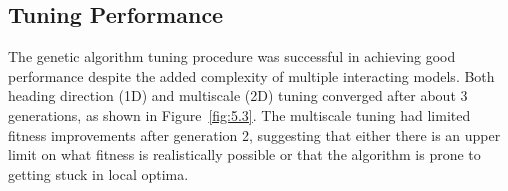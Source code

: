 \subsection{Tuning Performance}
\label{subsec:GA}

The genetic algorithm tuning procedure was successful in achieving good performance despite the added complexity of multiple interacting models. Both heading direction (1D) and multiscale (2D) tuning converged after about 3 generations, as shown in Figure~\ref{fig:5.3}. The multiscale tuning had limited fitness improvements after generation 2, suggesting that either there is an upper limit on what fitness is realistically possible or that the algorithm is prone to getting stuck in local optima.

%

%

%
%
%



%
%

%






%

